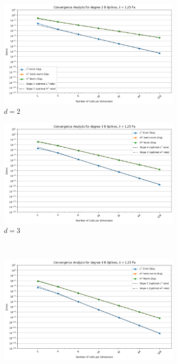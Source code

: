 \documentclass[a4paper,12pt,twoside]{report}
\begin{document}
\begin{figure}[!h]
	\centering
	\begin{subfigure}[b]{0.49\textwidth}
		\centering
		\includegraphics[width=\textwidth]{figures/figures_non_mixed_DH/convergence_plot_degree_2_lambda=1.25.png}
		\caption{$d=2$}
		\label{fig:deg2_NMDHBC}
	\end{subfigure}
	\begin{subfigure}[b]{0.49\textwidth}
		\centering
		\includegraphics[width=\textwidth]{figures/figures_non_mixed_DH/convergence_plot_degree_3_lambda=1.25.png}
		\caption{$d=3$}
		\label{fig:deg3_NMDHBC}
	\end{subfigure}
	\\
	\begin{subfigure}[b]{0.49\textwidth}
		\centering
		\includegraphics[width=\textwidth]{figures/figures_non_mixed_DH/convergence_plot_degree_4_lambda=1.25.png}

\end{subfigure}
\end{figure}
\end{document}
